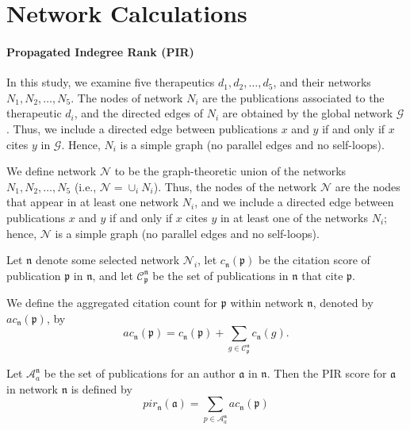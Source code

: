 \documentclass[12pt]{amsart}
\title{}
\author{}
\date{} %
\begin{document}
\section*{Network Calculations}

\vspace{.1in}

\paragraph{\textbf{Propagated Indegree Rank (PIR)}} 
In this study, we examine five therapeutics $d_1, d_2, \ldots, d_5$, and their networks $N_1, N_2, \ldots, N_5$.
The nodes of network $N_i$ are the publications associated to the therapeutic $d_i$, and the directed edges of $N_i$ are
obtained by the global network $\mathcal{G}$. Thus, we include a directed
edge between publications $x$ and $y$ if  and only if $x$ cites $y$  in $\mathcal{G}$. Hence, 
$N_i$ is a simple graph (no parallel edges and no self-loops).


We define  network $\mathcal{N}$ to be the graph-theoretic union of the
networks $N_1, N_2, \ldots, N_5$ (i.e., $\mathcal{N} =\cup_i N_i$). Thus, the nodes of the
network $\mathcal{N}$ are the nodes that appear in at least one network $N_i$, and we include a directed
edge between publications $x$ and $y$ if  and only if $x$ cites $y$ in at least one of the networks $N_i$; hence, 
$\mathcal{N}$ is a simple graph (no parallel edges and no self-loops).



Let $\mathfrak{n}$ denote some selected network $\mathcal{N}_i$, 
let $c_{\mathfrak{n}}(\mathfrak{p})$ be the citation score of publication $\mathfrak{p}$ in  $\mathfrak{n}$, and let $\mathcal{C}_\mathfrak{p}^\mathfrak{n}$ be the set of publications in $\mathfrak{\mathfrak{n}}$ that cite $\mathfrak{p}$. 

We define the aggregated citation count for  $\mathfrak{p}$ within network $\mathfrak{\mathfrak{n}}$, denoted by  $ac_{\mathfrak{n}}(\mathfrak{p})$, by
$$ ac_{\mathfrak{n}}(\mathfrak{p}) = c_{\mathfrak{n}}(\mathfrak{p}) + \sum_{g\in \mathcal{C}_\mathfrak{p}^\mathfrak{n}}  c_{\mathfrak{n}}(g).$$

Let $\mathcal{A}_a^{\mathfrak{n}}$ be the set of publications for an author $\mathfrak{a}$ in  $\mathfrak{\mathfrak{n}}$. Then the PIR score  for  $\mathfrak{a}$  in network $\mathfrak{n}$ is defined by $$ pir_{\mathfrak{n}}(\mathfrak{a}) =  \sum_{p\in \mathcal{A}_a^{\mathfrak{n}}}  ac_{\mathfrak{n}}(\mathfrak{p}) $$ 
\end{document}
